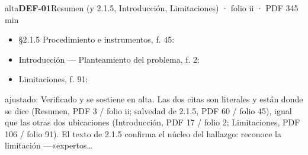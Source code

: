 \begin{ficha}{alta}{\casilla\textbf{DEF-01}\quad{}\quad Resumen (y 2.1.5, Introducción, Limitaciones) · folio ii · PDF 3\hfill 45 min}
\begin{itemize}[leftmargin=1.2em,itemsep=1pt,topsep=1pt]
\item {\small §2.1.5 Procedimiento e instrumentos, f. 45: }
\item {\small Introducción — Planteamiento del problema, f. 2: }
\item {\small Limitaciones, f. 91: }
\end{itemize}
{\footnotesize\color{gris}ajustado: Verificado y se sostiene en alta. Las dos citas son literales y están donde se dice (Resumen, PDF 3 /\allowbreak{} folio ii; salvedad de 2.1.5, PDF 60 /\allowbreak{} folio 45), igual que las otras dos ubicaciones (Introducción, PDF 17 /\allowbreak{} folio 2; Limitaciones, PDF 106 /\allowbreak{} folio 91). El texto de 2.1.5 confirma el núcleo del hallazgo: reconoce la limitación —«expertos…\par}
\end{ficha}
